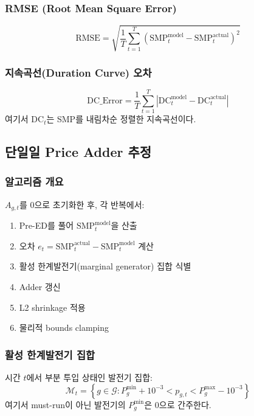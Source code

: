 \documentclass[11pt, a4paper]{article}
\begin{document}
\subsubsection{RMSE (Root Mean Square Error)}
\begin{equation}\label{eq:rmse}
    \text{RMSE} = \sqrt{\frac{1}{T} \sum_{t=1}^{T} (\text{SMP}_t^{\text{model}} - \text{SMP}_t^{\text{actual}})^2}
\end{equation}

\subsubsection{지속곡선(Duration Curve) 오차}
\begin{equation}
    \text{DC\_Error} = \frac{1}{T} \sum_{t=1}^{T} |\text{DC}_t^{\text{model}} - \text{DC}_t^{\text{actual}}|
\end{equation}
여기서 $\text{DC}_t$는 SMP를 내림차순 정렬한 지속곡선이다.

\subsection{단일일 Price Adder 추정}\label{sec:single_day_adder}

\subsubsection{알고리즘 개요}

$A_{g,t}$를 0으로 초기화한 후, 각 반복에서:
\begin{enumerate}[noitemsep]
    \item Pre-ED를 풀어 $\text{SMP}_t^{\text{model}}$을 산출
    \item 오차 $e_t = \text{SMP}_t^{\text{actual}} - \text{SMP}_t^{\text{model}}$ 계산
    \item 활성 한계발전기(marginal generator) 집합 식별
    \item Adder 갱신
    \item L2 shrinkage 적용
    \item 물리적 bounds clamping
\end{enumerate}

\subsubsection{활성 한계발전기 집합}

시간 $t$에서 부분 투입 상태인 발전기 집합:
\begin{equation}\label{eq:marg_set}
    \mathcal{M}_t = \left\{g \in \mathcal{G} : P_g^{\min} + 10^{-3} < p_{g,t} < P_g^{\max} - 10^{-3}\right\}
\end{equation}
여기서 must-run이 아닌 발전기의 $P_g^{\min}$은 0으로 간주한다.
\end{document}
